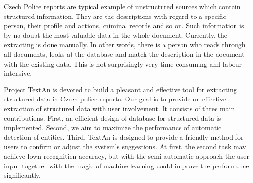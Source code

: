 Czech Police reports are typical example of unstructured sources which contain structured information.
They are the descriptions with regard to a specific person, their profile and actions, criminal records and so on.
Such information is by no doubt the most valuable data in the whole document.
Currently, the extracting is done manually.
In other words, there is a person who reads through all documents,
looks at the database and match the description in the document with the existing data.
This is not-surprisingly very time-consuming and labour-intensive. 

Project TextAn is devoted to build a pleasant and effective tool for extracting structured data in Czech police reports. 
Our goal is to provide an effective extraction of structured data with user involvement.
It consists of three main contributions.
First, an efficient design of database for structured data is implemented.
Second, we aim to maximize the performance of automatic detection of entities.
Third, TextAn is designed to provide a friendly method for users to confirm or adjust the system's suggestions.
At first, the second task may achieve lown recognition accuracy,
but with the semi-automatic approach the user input together with the magic of machine learning could improve the performance significantly. 
